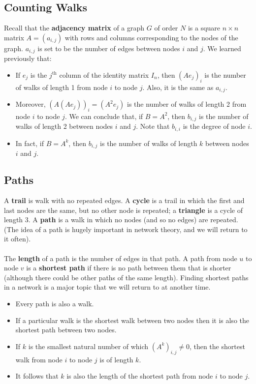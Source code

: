 \documentclass[a4paper,11pt]{article}
\begin{document}
\subsection{Counting Walks}
Recall that the \textbf{adjacency matrix} of a graph $G$ of order $N$ is a square $n \times n$ matrix $A = (a_{i,j})$ with rows and columns corresponding to the nodes of the graph.
$a_{i,j}$ is set to be the number of edges between nodes $i$ and $j$.
We learned previously that:
\begin{itemize}
    \item   If $e_j$ is the $j^\text{th}$ column of the identity matrix $I_n$, then $(Ae_j)_i$ is the number of walks of length 1 from node $i$ to node $j$.
            Also, it is the same as $a_{i,j}$.

    \item   Moreover, $(A(Ae_j))_i = (A^2e_j)$ is the number of walks of length 2 from node $i$ to node $j$.
            We can conclude that, if $B=A^2$, then $b_{i,j}$ is the number of walks of length 2 between nodes $i$ and $j$.
            Note that $b_{i,i}$ is the degree of node $i$.

    \item   In fact, if $B=A^k$, then $b_{i,j}$ is the number of walks of length $k$ between nodes $i$ and $j$.
\end{itemize}

\subsection{Paths}
A \textbf{trail} is  walk with no repeated edges.
A \textbf{cycle} is a trail in which the first and last nodes are the same, but no other node is repeated;
a \textbf{triangle} is a cycle of length 3.
A \textbf{path} is a walk in which no nodes (and so no edges) are repeated.
(The idea of a path is hugely important in network theory, and we will return to it often).
\\\\
The \textbf{length} of a path is the number of edges in that path.
A path from node $u$ to node $v$ is a \textbf{shortest path} if there is no path between them that is shorter (although there could be other paths of the same length).
Finding shortest paths in a network is a major topic that we will return to at another time.
\begin{itemize}
    \item   Every path is also a walk.
    \item   If a particular walk is the shortest walk between two nodes then it is also the shortest path between two nodes.
    \item   If $k$ is the smallest natural number of which $(A^k)_{i,j} \neq 0$, then the shortest walk from node $i$ to node $j$ is of length $k$.
    \item   It follows that $k$ is also the length of the shortest path from node $i$ to node $j$.
\end{itemize}
\end{document}
